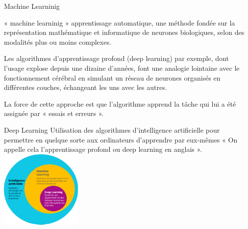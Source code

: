 \begin{frame}{Machine Learninig}
    \begin{itemize}[<+-|alert@+>]
        \myitem
        « machine learninig » apprentissage automatique, une méthode fondée sur
        la représentation mathématique et informatique de neurones
        biologiques, selon des modalités plus ou moins complexes.

        \myitem
        Les algorithmes d'apprentissage profond (deep learning) par exemple, dont
        l'usage explose depuis une dizaine d'années, font une analogie
        lointaine avec le fonctionnement cérébral en simulant un réseau de
        neurones organisés en différentes couches, échangeant les uns avec les
        autres.

        \myitem
        La force de cette approche est que l'algorithme apprend la
        tâche qui lui a été assignée par « essais et erreurs ».\mybox
    \end{itemize}

    \vspace{80mm}

\end{frame}

\begin{frame}{Deep Learning}
    Utilisation des algorithmes d'intelligence artificielle pour permettre
    en quelque sorte aux ordinateurs d'apprendre par eux-mêmes « On
    appelle cela l'apprentissage profond ou deep learning en anglais ».\mybox
    \\
    \bigskip
    \bigskip
    \centering
    \includegraphics[height=0.3\textwidth,width=0.3\textwidth]{ai1a.png}
\end{frame}


